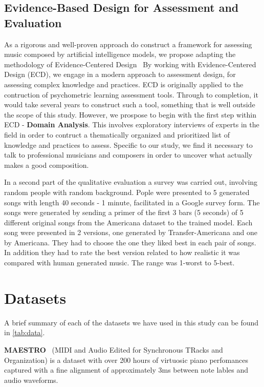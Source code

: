 \documentclass{IEEEtran}
\begin{document}
        \subsection{Evidence-Based Design for Assessment and Evaluation}
        As a rigorous and well-proven approach do construct a framework for 
        assessing music composed by artificial intelligence models, we propose 
        adapting the methodology of Evidence-Centered
        Design~\cite{mislevy2003focus,mislevy2017evidence}
        By working with Evidence-Centered Design (ECD), we engage in a modern
        approach to assessment design,
        for assessing complex knowledge and practices.
        ECD is originally applied to the contruction of psychometric learning
        assessment tools. Through to completion, it would take several years to 
        construct such a tool, something that is well outside the scope of this 
        study. However, we prospose to begin with the first step within ECD - 
        \textbf{Domain Analysis}. This involves exploratory interviews of experts
        in the field in order to contruct a thematically organized and prioritized
        list of knowledge and practices to assess. Specific to our study,
        we find it necessary to talk to professional musicians and composers 
        in order to uncover what actually makes a good composition.
        
        In a second part of the qualitative evaluation a survey was carried out, involving random people with random background. Pople were presented to 5 generated songs with length 
        40 seconds - 1 minute, facilitated in a Google survey form. The songs were generated by sending a primer of the first 3 bars (5 seconds) of 5 different original songs from the Americana dataset to the trained model. Each song were presented in 2 versions, one generated  by Transfer-Americana and one by Americana. They had to choose the one they liked best in each pair of songs. In addition they 
        had to rate the best version related to how realistic it was compared with human 
        generated music. The range was 1-worst to 5-best.

    \section{Datasets}

        A brief summary of each of the datasets we have used in this study 
        can be found in \autoref{tab:data}.

        \textbf{MAESTRO}~\cite{maestrodataset}
        (MIDI and Audio Edited for Synchronous TRacks and Organization)
        is a dataset with over 200 hours of virtuosic piano perfomances captured with 
        a fine alignment of approximately 3ms between note lables and audio waveforms.
\end{document}
